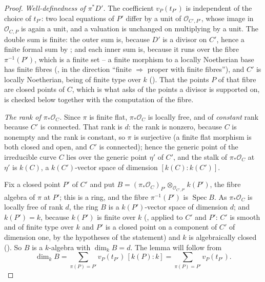 \begin{proof}
\emph{Well-definedness of \(\pi^*D'\).}  The coefficient
\(v_P(t_{P'})\) is independent of the choice of \(t_{P'}\): two local
equations of \(P'\) differ by a unit of \(\mathcal O_{C',P'}\), whose
image in \(\mathcal O_{C,P}\) is again a unit, and a valuation is
unchanged on multiplying by a unit.  The double sum is finite: the
outer sum is, because \(D'\) is a divisor on \(C'\), hence a finite
formal sum by ; and each inner sum is, because it
runs over the fibre \(\pi^{-1}(P')\), which is a finite set -- a finite
morphism to a locally Noetherian base has finite fibres
(, in the direction
``finite \(\Rightarrow\) proper with finite fibres''), and \(C'\) is
locally Noetherian, being of finite type over \(k\)
().  That the points \(P\) of that fibre are
closed points of \(C\), which is what  asks of
the points a divisor is supported on, is checked below together with
the computation of the fibre.

\emph{The rank of \(\pi_*\mathcal O_C\).}
Since \(\pi\) is finite flat, \(\pi_*\mathcal O_C\) is locally free,
and of \emph{constant} rank because \(C'\) is connected.  That rank is
\(d\): the rank is nonzero, because \(C\) is nonempty and the rank is
constant, so \(\pi\) is surjective (a finite flat morphism is both
closed and open, and \(C'\) is connected); hence the generic point of
the irreducible curve \(C\) lies over the generic point \(\eta'\) of
\(C'\), and the stalk of \(\pi_*\mathcal O_C\) at
\(\eta'\) is \(k(C)\), a \(k(C')\)-vector space of dimension
\([k(C):k(C')]\).

Fix a closed point \(P'\) of \(C'\) and put
\(B=(\pi_*\mathcal O_C)_{P'}\otimes_{\mathcal O_{C',P'}}k(P')\), the
fibre algebra of \(\pi\) at \(P'\); this is a ring, and the fibre
\(\pi^{-1}(P')\) is \(\operatorname{Spec}B\).  As
\(\pi_*\mathcal O_C\) is locally free of rank \(d\), the ring \(B\) is
a \(k(P')\)-vector space of dimension \(d\); and \(k(P')=k\), because
\(k(P')\) is finite over \(k\)
(, applied to \(C'\) and \(P'\):
\(C'\) is smooth and of finite type over \(k\) and \(P'\) is a closed
point on a component of \(C'\) of dimension one, by the hypotheses of
the statement) and \(k\) is algebraically closed
().  So \(B\) is a
\(k\)-algebra with \(\dim_kB=d\).  The lemma will follow from
\[
 \dim_kB=\sum_{\pi(P)=P'}v_P(t_{P'})\,[k(P):k]
 =\sum_{\pi(P)=P'}v_P(t_{P'}).
\]


\end{proof}
